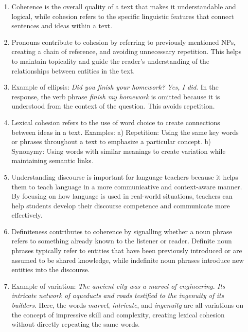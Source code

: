 \begin{tcolorbox}[title=Answer Key 1--7, colback=white, colframe=blue!75!black, fonttitle=\bfseries]

\begin{enumerate}[noitemsep]
    \item Coherence is the overall quality of a text that makes it understandable and logical, while cohesion refers to the specific linguistic features that connect sentences and ideas within a text.
    \item Pronouns contribute to cohesion by referring to previously mentioned NPs, creating a chain of reference, and avoiding unnecessary repetition. This helps to maintain topicality and guide the reader's understanding of the relationships between entities in the text.
    \item Example of ellipsis: \textit{Did you finish your homework?} \textit{Yes, I did.} In the response, the verb phrase \textit{finish my homework} is omitted because it is understood from the context of the question. This avoids repetition.
    \item Lexical cohesion refers to the use of word choice to create connections between ideas in a text. Examples: a) Repetition: Using the same key words or phrases throughout a text to emphasize a particular concept. b) Synonymy: Using words with similar meanings to create variation while maintaining semantic links.
    \item Understanding discourse is important for language teachers because it helps them to teach language in a more communicative and context-aware manner. By focusing on how language is used in real-world situations, teachers can help students develop their discourse competence and communicate more effectively.
    \item Definiteness contributes to coherence by signalling whether a noun phrase refers to something already known to the listener or reader. Definite noun phrases typically refer to entities that have been previously introduced or are assumed to be shared knowledge, while indefinite noun phrases introduce new entities into the discourse.
    \item Example of variation: \textit{The ancient city was a marvel of engineering. Its intricate network of aqueducts and roads testified to the ingenuity of its builders.} Here, the words \textit{marvel}, \textit{intricate}, and \textit{ingenuity} are all variations on the concept of impressive skill and complexity, creating lexical cohesion without directly repeating the same words.
\end{enumerate}
\end{tcolorbox}

